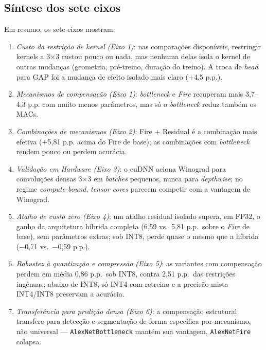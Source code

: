 \documentclass[conference]{IEEEtran}
\begin{document}
\subsection{Síntese dos sete eixos}

Em resumo, os sete eixos mostram:

\begin{enumerate}
\item \emph{Custo da restrição de kernel (Eixo 1)}: nas comparações disponíveis, restringir kernels
a 3$\times$3 custou pouco ou nada, mas nenhuma delas isola o kernel de outras mudanças (geometria, pré-treino, duração do treino). A troca
de \textit{head} para GAP foi a mudança de efeito isolado mais claro ($+$4,5 p.p.).

\item \emph{Mecanismos de compensação (Eixo 1)}: \textit{bottleneck} e \textit{Fire} recuperam mais
3,7--4,3 p.p. com muito menos parâmetros, mas só o \textit{bottleneck} reduz também os MACs.

\item \emph{Combinações de mecanismos (Eixo 2)}: Fire + Residual é a combinação mais efetiva
($+$5,81 p.p. acima do Fire de base); as combinações com \textit{bottleneck} rendem pouco ou perdem
acurácia.

\item \emph{Validação em Hardware (Eixo 3)}: o cuDNN aciona Winograd para convoluções densas
3$\times$3 em \textit{batches} pequenos, nunca para \textit{depthwise}; no regime
\textit{compute-bound}, \textit{tensor cores} parecem competir com a vantagem de Winograd.

\item \emph{Atalho de custo zero (Eixo 4)}: um atalho residual isolado supera, em FP32, o ganho da
arquitetura híbrida completa (6,59 vs.\ 5,81 p.p.\ sobre o \textit{Fire} de base), sem parâmetros
extras; sob INT8, perde quase o mesmo que a híbrida ($-$0,71 vs.\ $-$0,59 p.p.).

\item \emph{Robustez à quantização e compressão (Eixo 5)}: as variantes com compensação perdem em
média 0,86 p.p.\ sob INT8, contra 2,51 p.p.\ das restrições ingênuas; abaixo de INT8, só INT4 com
retreino e a precisão mista INT4/INT8 preservam a acurácia.

\item \emph{Transferência para predição densa (Eixo 6)}: a compensação estrutural transfere para
detecção e segmentação de forma específica por mecanismo, não universal — \texttt{AlexNetBottleneck}
mantém sua vantagem, \texttt{AlexNetFire} colapsa.


\end{enumerate}
\end{document}
